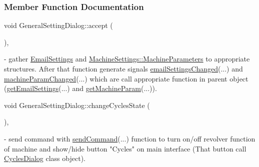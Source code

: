 \subsubsection{Member Function Documentation}
\mbox{\label{classGeneralSettingDialog_a8f189ce9494b6c5488f8a2be4c792f6a}} 
{\footnotesize\ttfamily void General\+Setting\+Dialog\+::\texorpdfstring{accept}{accept} (\begin{DoxyParamCaption}{ }\end{DoxyParamCaption}){\ttfamily [private]}, {\ttfamily [slot]}} - gather \hyperlink{structEmailSettings}{Email\+Settings} and \hyperlink{classMachineSettings_a87879e13793dbc7c10d4fa18e1236751}{Machine\+Settings\+::\+Machine\+Parameters} to appropriate structures. After that function generate signals \hyperlink{classGeneralSettingDialog_a825854c03817dfdb5b7c6185008ab620}{email\+Settings\+Changed}(...) and \hyperlink{classGeneralSettingDialog_a02019fb6d81fc0e83ed6ae0ef7ef68b4}{machine\+Param\+Changed}(...) which are call appropriate function in parent object (\hyperlink{classMainWindow_a5782e86aacd3c157412821fae13c85fb}{get\+Email\+Settings}(...) and \hyperlink{classMainWindow_a2dc63192aa7ff54dfc64e8308712c287}{get\+Machine\+Param}(...)).

\mbox{\label{classGeneralSettingDialog_aada0bfc2b43de3d88d705194362a769d}} 
{\footnotesize\ttfamily void General\+Setting\+Dialog\+::\texorpdfstring{change\+Cycles\+State}{changeCyclesState} (\begin{DoxyParamCaption}{ }\end{DoxyParamCaption}){\ttfamily [private]}, {\ttfamily [slot]}} - send command with \hyperlink{classGeneralSettingDialog_aa381596bc44cfcaeb85a8d906b877b86}{send\+Command}(...) function to turn on/off revolver function of machine and show/hide button "Cycles" on main interface (That button call \hyperlink{classCyclesDialog}{Cycles\+Dialog} class object).

